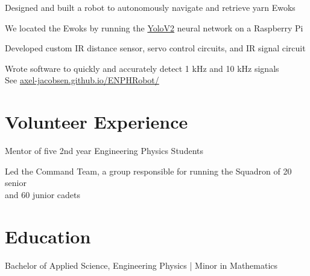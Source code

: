 \documentclass[]{deedy-resume-openfont}
\begin{document}
\begin{tightemize}
	\item Designed and built a robot to autonomously navigate and retrieve yarn Ewoks
	\item We located the Ewoks by running the \href{https://pjreddie.com/darknet/yolov2/}{YoloV2} neural network on a Raspberry Pi
	\item Developed custom IR distance sensor, servo control circuits, and IR signal circuit
	\item Wrote software to quickly and accurately detect 1 kHz and 10 kHz signals \\
	See \href{https://axel-jacobsen.github.io/ENPHRobot/}{axel-jacobsen.github.io/ENPHRobot/}
	\vspace{10pt}
\end{tightemize}
\sectionsep

\section{Volunteer Experience}
\begin{tightemize}
	\item Mentor of five 2nd year Engineering Physics Students
\end{tightemize}
\sectionsep

\begin{tightemize}
	\item Led the Command Team, a group responsible for running the Squadron of  20 senior \\ and 60  junior cadets
    \vspace{10pt}
\end{tightemize}
\sectionsep


\section{Education}
\begin{tightemize}
	\item Bachelor of Applied Science, Engineering Physics | Minor in Mathematics \\
\end{tightemize}
\sectionsep
\end{document}
